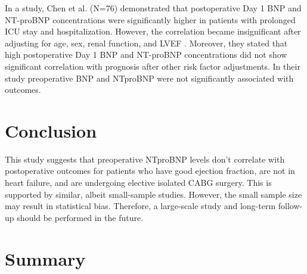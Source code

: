 \documentclass[14pt,a4paper,onecolumn]{extarticle}
\begin{document}
In a study, Chen et al. (N=76) demonstrated that postoperative Day 1 BNP and NT-proBNP concentrations were significantly higher in patients with prolonged ICU stay and hospitalization. However, the correlation became insignificant after adjusting for age, sex,  renal function, and LVEF \citep{Chen2013}. Moreover, they stated that high postoperative Day 1 BNP and NT-proBNP concentrations did not show significant correlation with prognosis after other risk factor adjustments.  In their study preoperative BNP and NTproBNP were not significantly associated with outcomes.


\section{Conclusion}

This study suggests that preoperative NTproBNP levels don't correlate with postoperative outcomes for patients who have good ejection fraction, are not in heart failure, and are undergoing elective isolated CABG surgery. This is supported by similar, albeit small-sample studies.  However, the small sample size may result in statistical bias. Therefore, a large-scale study and long-term follow-up should be performed in the future.


\section{Summary}

\newpage


\end{document}
